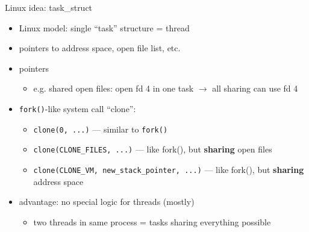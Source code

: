 \begin{frame}{Linux idea: task\_struct}
\begin{itemize}
\item Linux model: single ``task'' structure = thread
\item pointers to address space, open file list, etc.
\item pointers 
    \begin{itemize}
    \item e.g. shared open files: open fd 4 in one task $\rightarrow$ all sharing can use fd 4
    \end{itemize}
\vspace{.5cm}
\item \texttt{fork()}-like system call ``clone'': 
    \begin{itemize}
    \item \texttt{clone(0, ...)} --- similar to \texttt{fork()}
    \item \texttt{clone(CLONE\_FILES, ...)} --- like fork(), but \textbf{sharing} open files
    \item \texttt{clone(CLONE\_VM, new\_stack\_pointer, ...)} --- like fork(), but \textbf{sharing} address space
    \end{itemize}
\vspace{.5cm}
\item<2-> advantage: no special logic for threads (mostly)
    \begin{itemize}
    \item two threads in same process = tasks sharing everything possible
    \end{itemize}
\end{itemize}
\end{frame}
